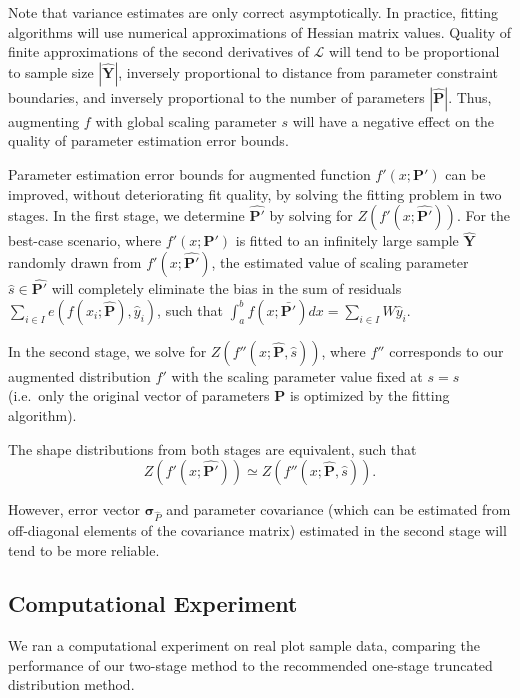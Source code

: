 \documentclass{article}
\begin{document}
Note that variance estimates are only correct asymptotically.
In practice, fitting algorithms will use numerical approximations of Hessian matrix values.
Quality of finite approximations of the second derivatives of $\mathcal{L}$ will tend to be proportional to sample size $|\bm{\hat{Y}}|$, inversely proportional to distance from parameter constraint boundaries, and inversely proportional to the number of parameters $|\bm{\hat{P}}|$.
Thus, augmenting $f$ with global scaling parameter $s$ will have a negative effect on the quality of parameter estimation error bounds. 

Parameter estimation error bounds for augmented function  $f'(x; \bm{P'})$ can be improved, without deteriorating fit quality, by solving the fitting problem in two stages.
In the first stage, we determine $\bm{\hat{P'}}$ by solving for $Z(f'(x; \bm{\hat{P'}}))$.
For the best-case scenario, where $f'(x; \bm{P'})$ is fitted to an infinitely large sample $\bm{\hat{Y}}$ randomly drawn from $f'(x; \bm{\hat{P'}})$, the estimated value of scaling parameter $\hat{s} \in \bm{\hat{P'}}$ will completely eliminate the bias in the sum of residuals $\sum_{i \in I} e(f(x_i; \bm{\hat{P}}), \hat{y}_i)$, such that $\int_a^b f(x; \bm{\bar{P'}}) dx = \sum_{i \in I} W\hat{y}_i$.

In the second stage, we solve for  $Z(f''(x; \bm{\hat{P}}, \hat{s}))$, where $f''$ corresponds to our augmented distribution $f'$ with the scaling parameter value fixed at $s = \hat{s}$ (i.e.~only the original vector of parameters $\bm{P}$ is optimized by the fitting algorithm).

The shape distributions from both stages are equivalent, such that
\begin{equation}
 Z(f'(x; \bm{\hat{P'}})) \simeq Z(f''(x; \bm{\hat{P}}, \hat{s})). 
\end{equation}

However, error vector $\bm{\sigma}_{\hat{P}}$ and parameter covariance (which can be estimated from off-diagonal elements of the covariance matrix) estimated in the second stage will tend to be more reliable.


\subsection{Computational Experiment}
\label{sec:methods_experiment}

We ran a computational experiment on real plot sample data, comparing the performance of our two-stage method to the recommended one-stage truncated distribution method.
\end{document}
